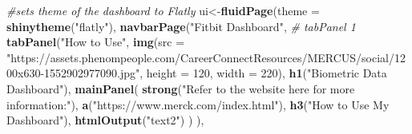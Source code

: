 \documentclass[]{book}
\newenvironment{Shaded}{\begin{snugshade}}{\end{snugshade}}
\newcommand{\CommentTok}[1]{\textcolor[rgb]{0.56,0.35,0.01}{\textit{#1}}}
\newcommand{\DataTypeTok}[1]{\textcolor[rgb]{0.13,0.29,0.53}{#1}}
\newcommand{\DecValTok}[1]{\textcolor[rgb]{0.00,0.00,0.81}{#1}}
\newcommand{\KeywordTok}[1]{\textcolor[rgb]{0.13,0.29,0.53}{\textbf{#1}}}
\newcommand{\NormalTok}[1]{#1}
\newcommand{\StringTok}[1]{\textcolor[rgb]{0.31,0.60,0.02}{#1}}
\begin{document}
\begin{Shaded}
\begin{Highlighting}[]
{{\CommentTok{#sets theme of the dashboard to Flatly}
\NormalTok{ui<-}\KeywordTok{fluidPage}\NormalTok{(}\DataTypeTok{theme =} \KeywordTok{shinytheme}\NormalTok{(}\StringTok{"flatly"}\NormalTok{),}
              \KeywordTok{navbarPage}\NormalTok{(}\StringTok{"Fitbit Dashboard"}\NormalTok{,}
                         \CommentTok{# tabPanel 1}
                         \KeywordTok{tabPanel}\NormalTok{(}\StringTok{"How to Use"}\NormalTok{,}
                                  \KeywordTok{img}\NormalTok{(}\DataTypeTok{src =} \StringTok{"https://assets.phenompeople.com/CareerConnectResources/MERCUS/social/1200x630-1552902977090.jpg"}\NormalTok{, }\DataTypeTok{height =} \DecValTok{120}\NormalTok{, }\DataTypeTok{width =} \DecValTok{220}\NormalTok{),}
                                  \KeywordTok{h1}\NormalTok{(}\StringTok{"Biometric Data Dashboard"}\NormalTok{),}
                                  \KeywordTok{mainPanel}\NormalTok{(}
                                    \KeywordTok{strong}\NormalTok{(}\StringTok{"Refer to the website here for more information:"}\NormalTok{),}
                                    \KeywordTok{a}\NormalTok{(}\StringTok{"https://www.merck.com/index.html"}\NormalTok{),}
                                    \KeywordTok{h3}\NormalTok{(}\StringTok{"How to Use My Dashboard"}\NormalTok{),}
                                    \KeywordTok{htmlOutput}\NormalTok{(}\StringTok{"text2"}\NormalTok{)}
\NormalTok{                                  )                      }
\NormalTok{                         ), }
                         
}}
\end{Highlighting}
\end{Shaded}
\end{document}
